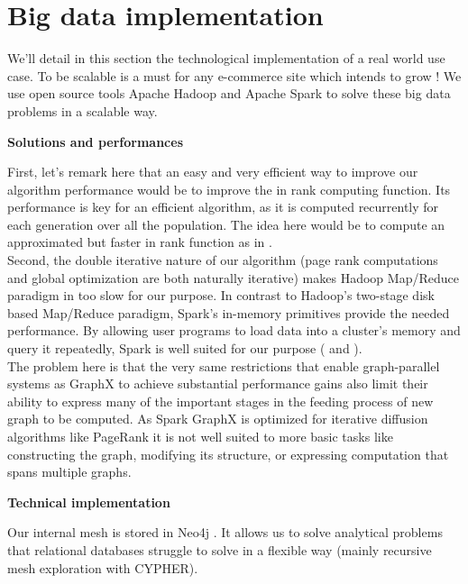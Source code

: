 \documentclass{iSWAGArticle}
\begin{document}
  \section{Big data implementation}
  We'll detail in this section the technological implementation of a real world use case.
  To be scalable is a must for any e-commerce site which intends to grow !
  We use open source tools Apache Hadoop \cite{apache_hadoop} and Apache Spark \cite{spark} to solve these big data problems in a scalable way. 
  \begin{center}
  \textbf{\large Solutions and performances}
  \end{center}
  First, let's remark here that an easy and very efficient way to improve our algorithm performance would be to improve the in rank computing function. Its performance is key for an efficient algorithm, as it
  is computed recurrently for each generation over all the population. The idea here would be to compute an approximated but faster in rank function as in \cite{page_rank_approx}.
  \\\newline
  Second, the double iterative nature of our algorithm (page rank computations and global optimization are both naturally iterative)
  makes Hadoop Map/Reduce paradigm in \cite{map_reduce} too slow for our purpose. 
  In contrast to Hadoop's two-stage disk based Map/Reduce paradigm, Spark's in-memory primitives provide the needed performance.
  By allowing user programs to load data into a cluster's memory and query it repeatedly, Spark is well suited for our purpose (\cite{incremental_ram} and
  \cite{spark_methodo}).
  \\\newline
  The problem here is that the very same restrictions that enable graph-parallel systems as GraphX to achieve substantial performance gains also 
  limit their ability to express many of the important stages in the feeding process of new graph to be computed.
  As Spark GraphX is optimized for iterative diffusion algorithms like PageRank it is not well suited to more basic tasks like constructing the graph,
  modifying its structure, or expressing computation that spans multiple graphs.
  \\\newline
  \begin{center}
  \textbf{\large Technical implementation}
  \end{center}
  Our internal mesh is stored in Neo4j \cite{neo4j}. It allows us to solve analytical problems
  that relational databases struggle to solve in a flexible way (mainly recursive mesh exploration with CYPHER). 
\end{document}
